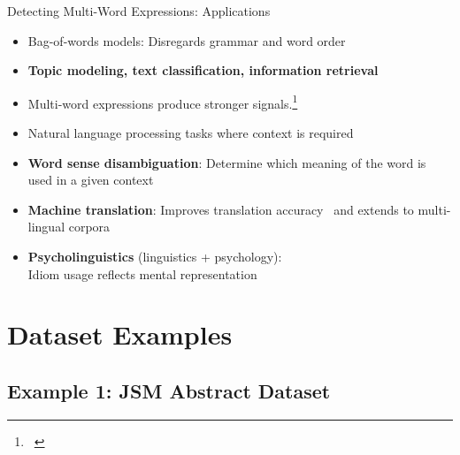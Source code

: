 \documentclass{beamer}
\renewcommand{\cite}{\citep}
\begin{document}
\begin{frame}{Detecting Multi-Word Expressions: Applications}
\begin{itemize}
\item Bag-of-words models: Disregards grammar and word order
\item \textbf{Topic modeling, text classification, information retrieval}
\item Multi-word expressions produce stronger signals.\footnote{~\cite{blei2009visualizing}}
	\bigskip
\item Natural language processing tasks where context is required
\item \textbf{Word sense disambiguation}: Determine which meaning of the word is used in a given context~\cite{finlayson2011detecting}
\item \textbf{Machine translation}: Improves translation accuracy~\cite{tan2014manawi} and extends to multi-lingual corpora~\cite{han2020multimwe}
\item \textbf{Psycholinguistics} (linguistics + psychology):\\ 
	Idiom usage reflects mental representation~\cite{muller2011multi}
\end{itemize}
\end{frame}

\section{Dataset Examples}


\subsection{Example 1: JSM Abstract Dataset}


\end{document}
